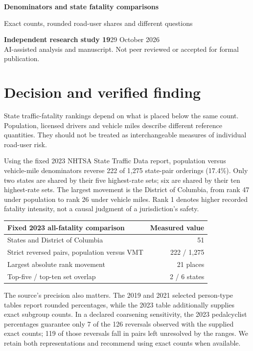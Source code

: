 \documentclass[10pt,letterpaper]{article}
\begin{document}
\color{ink}
{\LARGE\bfseries Denominators and state fatality comparisons\par}
{\large Exact counts, rounded road-user shares and different questions\par}
\textbf{Independent research study 19}\hfill29 October 2026\\
AI-assisted analysis and manuscript. Not peer reviewed or accepted for formal publication.

\section*{Decision and verified finding}
State traffic-fatality rankings depend on what is placed below the same count. Population, licensed drivers and vehicle miles describe different reference quantities. They should not be treated as interchangeable measures of individual road-user risk.

Using the fixed 2023 NHTSA State Traffic Data report, population versus vehicle-mile denominators reverse 222 of 1,275 state-pair orderings (17.4\%). Only two states are shared by their five highest-rate sets; six are shared by their ten highest-rate sets. The largest movement is the District of Columbia, from rank 47 under population to rank 26 under vehicle miles. Rank 1 denotes higher recorded fatality intensity, not a causal judgment of a jurisdiction's safety.

\begin{center}\begin{tabularx}{\linewidth}{Xr}\toprule
Fixed 2023 all-fatality comparison & Measured value\\\midrule
States and District of Columbia & 51\\
Strict reversed pairs, population versus VMT & 222 / 1,275\\
Largest absolute rank movement & 21 places\\
Top-five / top-ten set overlap & 2 / 6 states\\\bottomrule
\end{tabularx}\end{center}

The source's precision also matters. The 2019 and 2021 selected person-type tables report rounded percentages, while the 2023 table additionally supplies exact subgroup counts. In a declared coarsening sensitivity, the 2023 pedalcyclist percentages guarantee only 7 of the 126 reversals observed with the supplied exact counts; 119 of those reversals fall in pairs left unresolved by the ranges. We retain both representations and recommend using exact counts when available.
\end{document}
